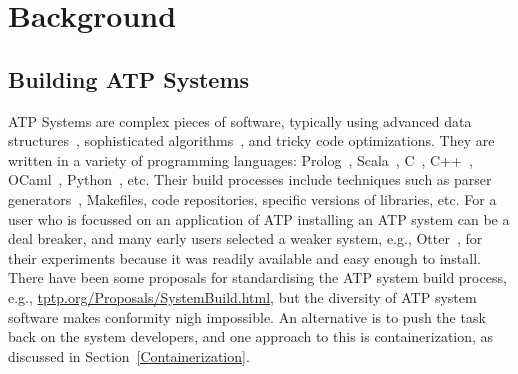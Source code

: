 \documentclass{easychair}
\begin{document}
\section{Background}
\label{Background}

\subsection{Building ATP Systems}
\label{Building}

ATP Systems are complex pieces of software, typically using advanced data structures~\cite{Sch13}, 
sophisticated algorithms~\cite{Vor01}, and tricky code optimizations\cite{Sch06}.
They are written in a variety of programming languages: Prolog~\cite{Ott23,Hol23}, 
Scala~\cite{SB18}, C~\cite{SCV19}, C++~\cite{RV02-AICOMM}, OCaml~\cite{Kor06}, Python~\cite{SP20}, 
etc.
Their build processes include techniques such as parser generators~\cite{Ste21}, Makefiles,
code repositories, specific versions of libraries, etc.
For a user who is focussed on an application of ATP
installing an ATP system can be a deal breaker, and many early users selected a weaker system, 
e.g., Otter~\cite{McC03-Otter}, for their experiments because it was readily available and easy 
enough to install.
There have been some proposals for standardising the ATP system build process, e.g.,
\href{https://tptp.org/Proposals/SystemBuild.html}{tptp.org/Proposals/SystemBuild.html}, 
but the diversity of ATP system software makes conformity nigh impossible.
An alternative is to push the task back on the system developers, and one approach to this is
containerization, as discussed in Section~\ref{Containerization}.
\end{document}
